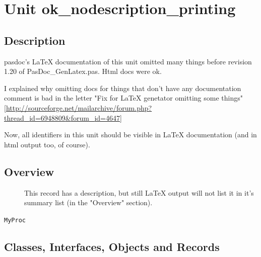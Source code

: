 \documentclass{report}
\newif\ifpdf
\begin{document}
\chapter{Unit ok{\_}nodescription{\_}printing}
\label{ok_nodescription_printing}
\section{Description}
pasdoc's LaTeX documentation of this unit omitted many things before revision 1.20 of PasDoc{\_}GenLatex.pas. Html docs were ok.

I explained why omitting docs for things that don't have any documentation comment is bad in the letter "Fix for LaTeX genetator omitting some things" [\href{http://sourceforge.net/mailarchive/forum.php?thread_id=6948809&forum_id=4647}{http://sourceforge.net/mailarchive/forum.php?thread{\_}id=6948809{\&}forum{\_}id=4647}]

Now, all identifiers in this unit should be visible in LaTeX documentation (and in html output too, of course).
\section{Overview}
\begin{description}
\item[\texttt{\begin{ttfamily}TClass1\end{ttfamily} Class}]
\item[\texttt{\begin{ttfamily}TMyRecord\end{ttfamily} Record}]
\item[\texttt{\begin{ttfamily}TMyRecord2\end{ttfamily} Record}]This record has a description, but still LaTeX output will not list it in it's summary list (in the "Overview" section).
\item[\texttt{\begin{ttfamily}TMyRecord3\end{ttfamily} Record}]
\end{description}
\begin{description}
\item[\texttt{MyProc}]
\end{description}
\section{Classes, Interfaces, Objects and Records}
\ifpdf
\end{document}
